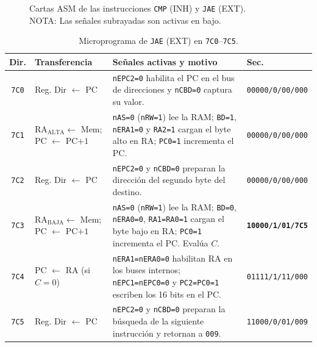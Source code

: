 \documentclass[letterpaper,12pt]{article}
\newcommand{\hx}[1]{\texttt{#1}}
\begin{document}
\begin{figure}[H]
\caption{Cartas ASM de las instrucciones \texttt{CMP} (INH) y \texttt{JAE} (EXT).\\NOTA: Las señales subrayadas son activas en bajo.}
\label{fig:asm-cmp-jae}
\end{figure}

\begin{table}[H]
\centering
\scriptsize
\caption{Microprograma de \texttt{JAE} (EXT) en \hx{7C0}--\hx{7C5}.}
\label{tab:jae-control}
\begin{tabularx}{\linewidth}{c l Y l}
\toprule
Dir. & Transferencia & Señales activas y motivo & Sec. \\
\midrule
\hx{7C0} & Reg. Dir $\leftarrow$ PC & \texttt{nEPC2=0} habilita el PC en el bus de direcciones y \texttt{nCBD=0} captura su valor. & \texttt{00000/0/00/000} \\
\hx{7C1} & RA$_{\text{ALTA}}\leftarrow$ Mem; PC $\leftarrow$ PC$+1$ & \texttt{nAS=0} (\texttt{nRW=1}) lee la RAM; \texttt{BD=1}, \texttt{nERA1=0} y \texttt{RA2=1} cargan el byte alto en RA; \texttt{PC0=1} incrementa el PC. & \texttt{00000/0/00/000} \\
\hx{7C2} & Reg. Dir $\leftarrow$ PC & \texttt{nEPC2=0} y \texttt{nCBD=0} preparan la dirección del segundo byte del destino. & \texttt{00000/0/00/000} \\
\hx{7C3} & RA$_{\text{BAJA}}\leftarrow$ Mem; PC $\leftarrow$ PC$+1$ & \texttt{nAS=0} (\texttt{nRW=1}) lee la RAM; \texttt{BD=0}, \texttt{nERA0=0}, \texttt{RA1=RA0=1} cargan el byte bajo en RA; \texttt{PC0=1} incrementa el PC. Evalúa $C$. & \textbf{\texttt{10000/1/01/7C5}} \\
\hx{7C4} & PC $\leftarrow$ RA (si $C=0$) & \texttt{nERA1=nERA0=0} habilitan RA en los buses internos; \texttt{nEPC1=nEPC0=0} y \texttt{PC2=PC0=1} escriben los 16 bits en el PC. & \texttt{01111/1/11/000} \\
\hx{7C5} & Reg. Dir $\leftarrow$ PC & \texttt{nEPC2=0} y \texttt{nCBD=0} preparan la búsqueda de la siguiente instrucción y retornan a \hx{009}. & \texttt{11000/0/01/009} \\
\bottomrule
\end{tabularx}
\end{table}
\end{document}
